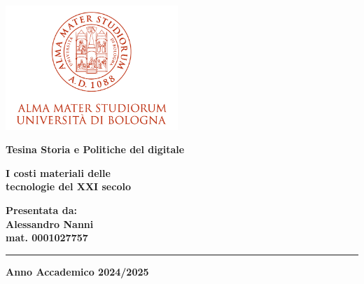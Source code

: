 \documentclass[12pt,a4paper,oneside]{book}
\begin{document}
\pagestyle{empty}

\begin{titlepage}

\begin{center}

\includegraphics[width=6.5cm,height=4.7cm]{img/marchio-di-ateneo.png}

\vspace{15mm}


{\Large{\bf{Tesina Storia e Politiche del digitale}}}

\vspace{15mm}

{\Huge{\bf I costi materiali delle }}\\
\vspace{3mm}
{\Huge{\bf tecnologie del XXI secolo}}\\
\vspace{3mm}
\end{center}

\vspace{20mm}

\hfill
\begin{minipage}[t]{0.40\textwidth}\raggedleft
{\Large{\bf Presentata da: \\ Alessandro Nanni \\ mat.
 0001027757}}
\end{minipage}

\vspace{90mm}

\rule[0.5cm]{15.8cm}{0.6mm}

\begin{center}
{\large{\bf Anno Accademico 2024/2025\\}}
\end{center}

\end{titlepage}
\end{document}
